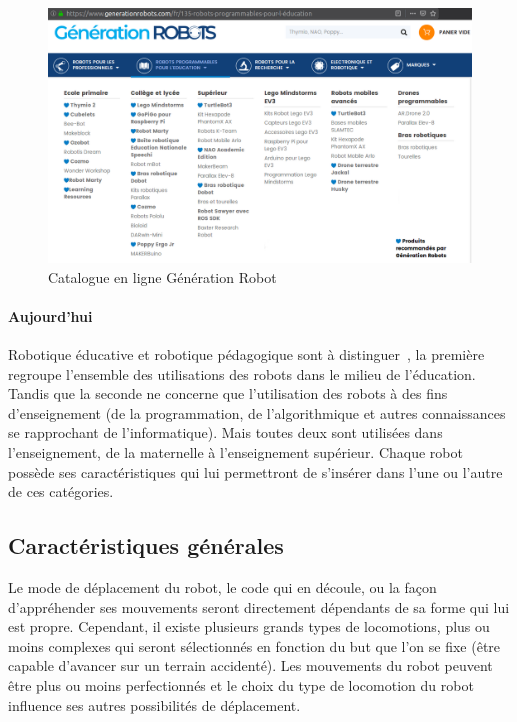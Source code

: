             \begin{figure}[!h]
                \centering
                \includegraphics[width=0.9\linewidth]{Figures/bot-GR}
                \caption{Catalogue en ligne Génération Robot}\label{fig:list_bot}
            \end{figure}
        \paragraph{Aujourd'hui}
            Robotique éducative et robotique pédagogique sont à distinguer~, la première regroupe l'ensemble des utilisations des robots dans le milieu de l'éducation. Tandis que la seconde ne concerne que l'utilisation des robots à des fins d'enseignement (de la programmation, de l'algorithmique et autres connaissances se rapprochant de l'informatique). Mais toutes deux sont utilisées dans l'enseignement, de la maternelle à l'enseignement supérieur. Chaque robot possède ses caractéristiques qui lui permettront de s'insérer dans l'une ou l'autre de ces catégories.
    \subsection{Caractéristiques générales}
            Le mode de déplacement du robot, le code qui en découle, ou la façon d'appréhender ses mouvements seront directement dépendants de sa forme qui lui est propre. Cependant, il existe plusieurs grands types de locomotions, plus ou moins complexes qui seront sélectionnés en fonction du but que l'on se fixe (\eg être capable d'avancer sur un terrain accidenté). Les mouvements du robot peuvent être plus ou moins perfectionnés et le choix du type de locomotion du robot influence ses autres possibilités de déplacement.
